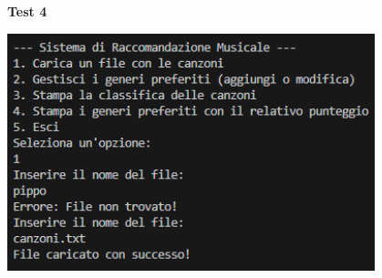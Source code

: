 \documentclass[a4paper,11pt]{article}
\begin{document}
\begin{center}
    \textbf{Test 4}
    \par
    \vspace{0.5cm}
    \includegraphics[width=0.8\textwidth]{htest4}
\end{center}
\end{document}
